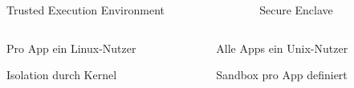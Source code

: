 \begin{frame}
\centering
	\begin{columns}[T] %
    	\begin{column}[T]{5cm} %
    		\begin{block}{}
				Trusted Execution Environment
			\end{block}
    	\end{column}
    	\begin{column}[T]{5cm}
    		\begin{block}{}
    			Secure Enclave
    		\end{block}
    	\end{column}
    \end{columns}
    
    \begin{columns}[c]
    	\begin{column}[c]{12cm}
		    \begin{block}{}
			\end{block}
		\end{column}
	\end{columns}
	
    \begin{columns}[t]
    	\begin{column}[t]{5cm}
    		\begin{block}{}
				Pro App ein Linux-Nutzer
			\end{block}
			\begin{block}{}
				Isolation durch Kernel
			\end{block}
    	\end{column}
    	\begin{column}[t]{5cm}
			\begin{block}{}
				Alle Apps ein Unix-Nutzer
			\end{block}
			\begin{block}{}
				Sandbox pro App definiert
			\end{block}
    	\end{column}
    \end{columns}
\end{frame}